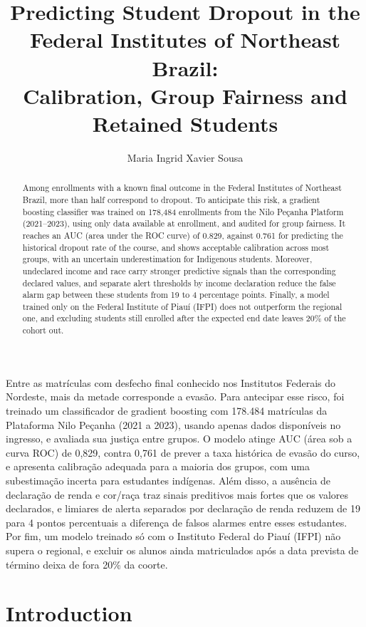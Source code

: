 \documentclass[12pt]{article}
\title{Predicting Student Dropout in the Federal Institutes of Northeast Brazil:\\
Calibration, Group Fairness and Retained Students}
\author{Maria Ingrid Xavier Sousa}
\begin{document}
\maketitle

\begin{abstract}
Among enrollments with a known final outcome in the Federal Institutes of Northeast Brazil, more than half
correspond to dropout. To
anticipate this risk, a gradient boosting classifier was trained on 178,484 enrollments from the Nilo Peçanha
Platform (2021--2023), using only data available at enrollment, and audited for group fairness. It reaches an AUC
(area under the ROC curve) of 0.829, against 0.761 for predicting the historical dropout rate of the course, and
shows acceptable calibration across most groups, with an uncertain underestimation for Indigenous students. Moreover, undeclared income and race carry
stronger predictive signals than the corresponding declared values, and separate alert thresholds by income declaration reduce the false alarm gap between these students from 19 to 4 percentage points. Finally, a model trained only on the Federal Institute of Piauí
(IFPI) does not outperform the regional one, and excluding students still enrolled after the expected end date leaves 20\% of the cohort out.
\end{abstract}

\begin{resumo}
Entre as matrículas com desfecho final conhecido nos Institutos \mbox{Federais} do Nordeste, mais da metade corresponde a
evasão. Para antecipar esse risco, foi treinado um classificador de gradient boosting com 178.484 matrículas da
Plataforma Nilo Peçanha (2021 a 2023), usando apenas dados disponíveis no ingresso, e avaliada sua justiça entre
grupos. O modelo atinge AUC (área sob a curva ROC) de 0,829, contra 0,761 de prever a taxa histórica de evasão do
curso, e apresenta calibração adequada para a maioria dos grupos, com uma subestimação incerta para estudantes
indígenas. Além disso, a ausência de declaração de renda e cor/raça traz sinais preditivos mais fortes que os valores
declarados, e limiares de alerta separados por declaração de renda reduzem de 19 para 4 pontos percentuais a diferença de falsos alarmes entre esses estudantes. Por fim, um modelo treinado só com o Instituto \mbox{Federal} do Piauí (IFPI) não supera
o regional, e excluir os alunos ainda matriculados após a data prevista de término deixa de fora 20\% da coorte.
\end{resumo}

\section{Introduction}
\end{document}

